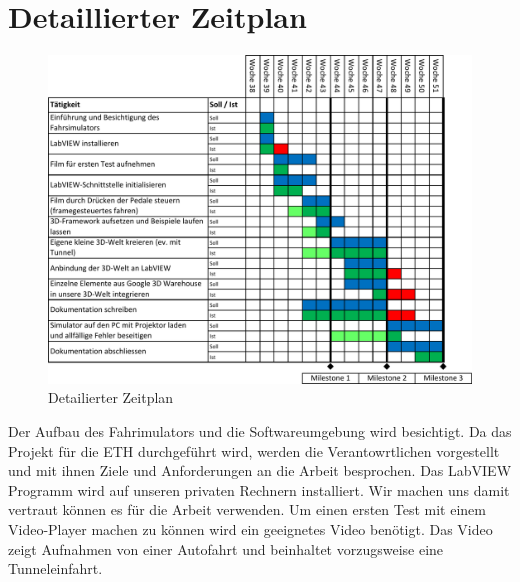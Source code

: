 \section{Detaillierter Zeitplan}
\label{detaillierter_zeitplan}

\begin{figure}[H]
\centering 
\includegraphics[width=1.0\linewidth]{src/Zeitplan.pdf}
\caption{Detailierter Zeitplan} %
\label{zeitplan} %
\end{figure}
Der Aufbau des Fahrimulators und die Softwareumgebung wird besichtigt. Da das Projekt für die ETH durchgeführt wird, werden die Verantowrtlichen vorgestellt und mit ihnen Ziele und Anforderungen an die Arbeit besprochen. 
Das LabVIEW Programm wird auf unseren privaten Rechnern installiert. Wir machen uns damit vertraut können es für die Arbeit verwenden. 
Um einen ersten Test mit einem Video-Player machen zu können wird ein geeignetes Video benötigt. Das Video zeigt Aufnahmen von einer Autofahrt und beinhaltet vorzugsweise eine Tunneleinfahrt.

\newpage

